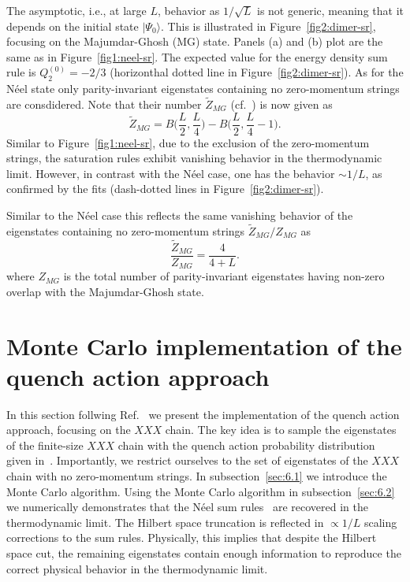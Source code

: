 \documentclass[11pt]{iopart}
\begin{document}
The asymptotic, i.e., at large $L$, behavior as $1/\sqrt{L}$ is not generic, 
meaning that it depends on the initial state $|\Psi_0\rangle$. 
This is illustrated in Figure~\ref{fig2:dimer-sr}, focusing on the Majumdar-Ghosh 
(MG) state. Panels (a) and (b) plot are the same as in Figure~\ref{fig1:neel-sr}. 
The expected value for the energy density sum rule is $Q_2^{(0)}=-2/3$ (horizonthal dotted 
line in Figure~\ref{fig2:dimer-sr}). 
As for the N\'eel state only parity-invariant eigenstates containing no zero-momentum 
strings are consdidered. Note that their number $\widetilde Z_{MG}$ (cf.~) 
is now given as 
%
\begin{equation}
\widetilde Z_{MG}=B\Big(\frac{L}{2},\frac{L}{4}\Big)-B\Big(\frac{L}{2},
\frac{L}{4}-1\Big). 
\end{equation}
%
Similar to Figure~\ref{fig1:neel-sr}, due to the exclusion of the zero-momentum 
strings, the saturation rules exhibit vanishing behavior in the thermodynamic 
limit. However, in contrast with the N\'eel case, one has the behavior $\sim 1/L$, 
as confirmed by the fits (dash-dotted lines in Figure~\ref{fig2:dimer-sr}). 

Similar to the N\'eel case this reflects the same vanishing behavior of the 
eigenstates containing no zero-momentum strings $\widetilde Z_{MG}/Z_{MG}$ as 
%
\begin{equation}
\frac{\widetilde Z_{MG}}{Z_{MG}}=\frac{4}{4+L}. 
\end{equation}
%
where $Z_{MG}$ is the total number of parity-invariant eigenstates having non-zero 
overlap with the Majumdar-Ghosh state. 


\section{Monte Carlo implementation of the quench action approach}
\label{sec6:mcqa}

In this section follwing Ref.~\cite{alba-2015} we present the implementation of 
the quench action approach, focusing on the $XXX$ chain. The key idea is to sample 
the eigenstates of the finite-size $XXX$ 
chain with the quench action probability distribution given in~. 
Importantly, we restrict ourselves to the set of eigenstates of the $XXX$ chain 
with no zero-momentum strings. In subsection~\ref{sec:6.1} we introduce the Monte 
Carlo algorithm. Using the Monte Carlo algorithm in subsection~\ref{sec:6.2} we 
numerically demonstrates that the N\'eel sum rules~ are recovered 
in the thermodynamic limit. The Hilbert space truncation is reflected in 
$\propto 1/L$ scaling corrections to the sum rules. Physically, this implies that 
despite the Hilbert space cut, the remaining eigenstates contain enough information 
to reproduce the correct physical behavior in the thermodynamic limit. 
\end{document}
